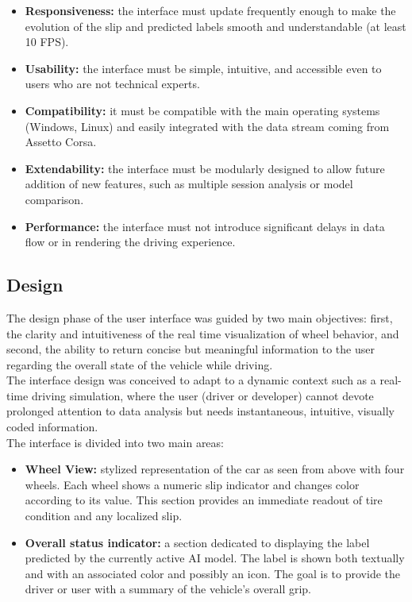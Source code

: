 \documentclass[a4paper,final,12pt]{report}
\begin{document}
\begin{itemize}
    \item \textbf{Responsiveness:} the interface must update frequently enough to make the evolution of the slip and predicted labels smooth and understandable (at least 10 FPS).
    \item \textbf{Usability:} the interface must be simple, intuitive, and accessible even to users who are not technical experts.
    \item \textbf{Compatibility:} it must be compatible with the main operating systems (Windows, Linux) and easily integrated with the data stream coming from Assetto Corsa.
    \item \textbf{Extendability:} the interface must be modularly designed to allow future addition of new features, such as multiple session analysis or model comparison.
    \item \textbf{Performance:} the interface must not introduce significant delays in data flow or in rendering the driving experience.
\end{itemize}

\subsection{Design}
The design phase of the user interface was guided by two main objectives: first, the clarity and intuitiveness of the real time visualization of wheel behavior, and second, the ability to return concise but meaningful information to the user regarding the overall state of the vehicle while driving.\\
The interface design was conceived to adapt to a dynamic context such as a real-time driving simulation, where the user (driver or developer) cannot devote prolonged attention to data analysis but needs instantaneous, intuitive, visually coded information.\\

The interface is divided into two main areas:
\begin{itemize}
    \item \textbf{Wheel View:} stylized representation of the car as seen from above with four wheels. Each wheel shows a numeric slip indicator and changes color according to its value. This section provides an immediate readout of tire condition and any localized slip.
    \item \textbf{Overall status indicator:} a section dedicated to displaying the label predicted by the currently active AI model. The label is shown both textually and with an associated color and possibly an icon. The goal is to provide the driver or user with a summary of the vehicle's overall grip.
\end{itemize}
\end{document}
